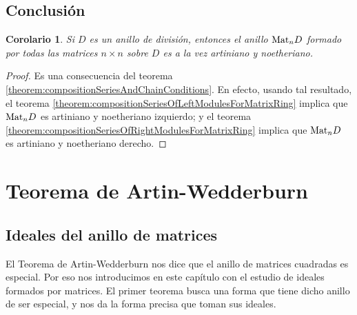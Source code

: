 \documentclass{report}
\newcommand{\Mat}{\textnormal{Mat}}
\newtheorem{corollary}{Corolario}
\begin{document}
  \section{Conclusión}

  \begin{corollary}\label{corollary:matrixRingIsArtinianAndNoetherian}
    Si \(D\) es un anillo de división, entonces el anillo \(\Mat_n D\) formado por todas las matrices \(n \times n\) sobre \(D\) es a la vez artiniano y noetheriano.
  \end{corollary}
  \begin{proof}
    Es una consecuencia del teorema \ref{theorem:compositionSeriesAndChainConditions}.
    En efecto, usando tal resultado, el teorema \ref{theorem:compositionSeriesOfLeftModulesForMatrixRing} implica que \(\Mat_n D\) es artiniano y noetheriano izquierdo; y el teorema \ref{theorem:compositionSeriesOfRightModulesForMatrixRing} implica que \(\Mat_n D\) es artiniano y noetheriano derecho.
  \end{proof}

  \chapter{Teorema de Artin-Wedderburn}

  \section{Ideales del anillo de matrices}

  El Teorema de Artin-Wedderburn nos dice que el anillo de matrices cuadradas es especial.
  Por eso nos introducimos en este capítulo con el estudio de ideales formados por matrices.
  El primer teorema busca una forma que tiene dicho anillo de ser especial, y nos da la forma precisa que toman sus ideales.
\end{document}
